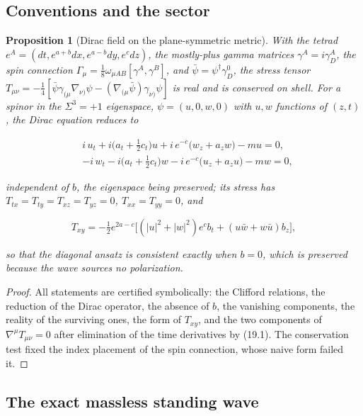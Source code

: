 \documentclass[11pt]{article}
\newtheorem{proposition}[theorem]{Proposition}
\theoremstyle{remark}
\begin{document}
\subsection{Conventions and the sector}

\begin{proposition}[Dirac field on the plane-symmetric metric]
\label{prop:v20v16-dirac}
With the tetrad \(e^A=(dt,e^{a+b}dx,e^{a-b}dy,e^cdz)\), the
mostly-plus gamma matrices \(\gamma^A=i\gamma^A_D\), the spin
connection \(\Gamma_\mu=\tfrac18\omega_{\mu AB}[\gamma^A,\gamma^B]\), and
\(\bar\psi=\psi^\dagger\gamma^0_D\), the stress tensor
\(T_{\mu\nu}=-\tfrac14[\bar\psi\gamma_{(\mu}\nabla_{\nu)}\psi-(\nabla_{(\mu}\bar\psi)\gamma_{\nu)}\psi]\)
is real and is conserved on shell.  For a spinor in the \(\Sigma^3=+1\)
eigenspace, \(\psi=(u,0,w,0)\) with \(u,w\) functions of \((z,t)\), the
Dirac equation reduces to

\[
\begin{aligned}
 &i\,u_t+i\bigl(a_t+\tfrac12c_t\bigr)u+i\,e^{-c}\bigl(w_z+a_zw\bigr)-mu=0,\\
 &-i\,w_t-i\bigl(a_t+\tfrac12c_t\bigr)w-i\,e^{-c}\bigl(u_z+a_zu\bigr)-mw=0,
\end{aligned}                                                          \tag{19.1}
\]

independent of \(b\), the eigenspace being preserved; its stress has
\(T_{tx}=T_{ty}=T_{xz}=T_{yz}=0\), \(T_{xx}=T_{yy}=0\), and

\[
 T_{xy}=-\tfrac12e^{2a-c}\bigl[(|u|^2+|w|^2)e^{c}b_t+(u\bar w+w\bar u)b_z\bigr],
                                                                    \tag{19.2}
\]

so that the diagonal ansatz is consistent exactly when \(b=0\), which
is preserved because the wave sources no polarization.
\end{proposition}

\begin{proof}
All statements are certified symbolically: the Clifford relations,
the reduction of the Dirac operator, the absence of \(b\), the
vanishing components, the reality of the surviving ones, the form of
\(T_{xy}\), and the two components of \(\nabla^\mu T_{\mu\nu}=0\) after
elimination of the time derivatives by (19.1).  The conservation test
fixed the index placement of the spin connection, whose naive form
failed it.
\end{proof}

\subsection{The exact massless standing wave}
\end{document}
